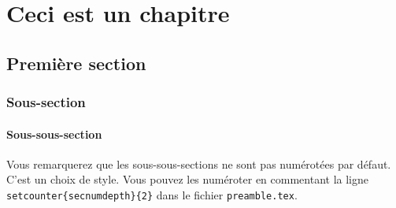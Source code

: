
\chapter{Ceci est un chapitre}

\section{Première section}


\subsection{Sous-section}

\subsubsection{Sous-sous-section}
Vous remarquerez que les sous-sous-sections ne sont pas numérotées par défaut. C'est un choix de style. Vous pouvez les numéroter en commentant la ligne \texttt{\\setcounter\{secnumdepth\}\{2\}} dans le fichier \texttt{preamble.tex}.